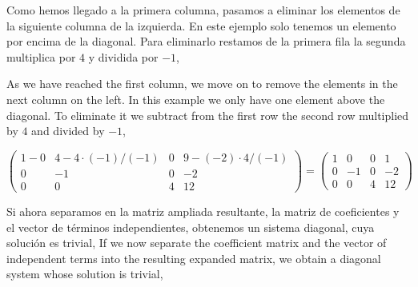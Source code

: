 \begin{paracol}{2}

Como hemos llegado a la primera columna, pasamos a eliminar los elementos de la siguiente columna de la izquierda. En este ejemplo solo tenemos un elemento por encima de la diagonal. Para eliminarlo restamos de la primera fila la segunda multiplica por $4$ y dividida por $-1$,

\switchcolumn

As we have reached the first column, we move on to remove the elements in the next column on the left. In this example we only have one element above the diagonal. To eliminate it we subtract from the first row the second row multiplied by $4$ and divided by $-1$,

\end{paracol}

\begin{equation*}
\begin{pmatrix}
1-0&     4-4\cdot(-1)/(-1)&     0&    9-(-2)\cdot4/(-1)\\
 0&    -1&    0&    -2\\
 0&     0&     4&    12
\end{pmatrix}=\begin{pmatrix}
1&     0&     0&    1\\
 0&    -1&    0&    -2\\
 0&     0&     4&    12
\end{pmatrix}
\end{equation*}

\begin{paracol}{2}
Si ahora separamos en la matriz ampliada resultante, la matriz de coeficientes y el vector de términos independientes, obtenemos un sistema diagonal, cuya solución es trivial,
\switchcolumn
If we now separate the coefficient matrix and the vector of independent terms into the resulting expanded matrix, we obtain a diagonal system whose solution is trivial,
\end{paracol}

